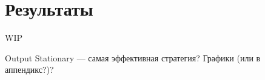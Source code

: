 \section{Результаты}
\label{sec:Chapter10} 

WIP

Output Stationary --- самая эффективная стратегия? Графики (или в аппендикс?)? 

\newpage
